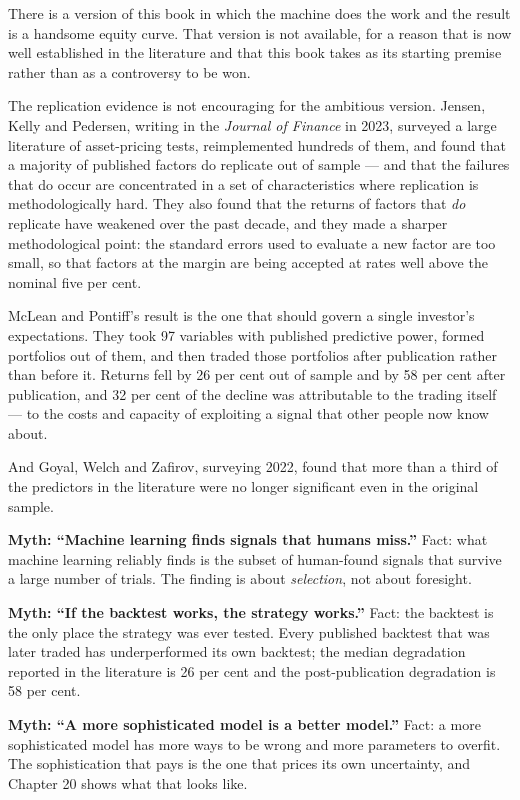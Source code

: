 There is a version of this book in which the machine does the work and the
result is a handsome equity curve. That version is not available, for a
reason that is now well established in the literature and that this book
takes as its starting premise rather than as a controversy to be won.

The replication evidence is not encouraging for the ambitious version.
Jensen, Kelly and Pedersen, writing in the \emph{Journal of Finance} in
2023, surveyed a large literature of asset-pricing tests, reimplemented
hundreds of them, and found that a majority of published factors do
replicate out of sample --- and that the failures that do occur are
concentrated in a set of characteristics where replication is
methodologically hard. They also found that the returns of factors that
\emph{do} replicate have weakened over the past decade, and they made a
sharper methodological point: the standard errors used to evaluate a new
factor are too small, so that factors at the margin are being accepted at
rates well above the nominal five per cent.

McLean and Pontiff's result is the one that should govern a single
investor's expectations. They took 97 variables with published predictive
power, formed portfolios out of them, and then traded those portfolios
after publication rather than before it. Returns fell by 26 per cent
out of sample and by 58 per cent after publication, and 32 per cent of the
decline was attributable to the trading itself --- to the costs and
capacity of exploiting a signal that other people now know about.

And Goyal, Welch and Zafirov, surveying 2022, found that more than a third
of the predictors in the literature were no longer significant even
in the original sample.

\begin{commonmyths}
\item \textbf{Myth: ``Machine learning finds signals that humans miss.''}
Fact: what machine learning reliably finds is the subset of human-found
signals that survive a large number of trials. The finding is about
\emph{selection}, not about foresight.
\item \textbf{Myth: ``If the backtest works, the strategy works.''}
Fact: the backtest is the only place the strategy was ever tested. Every
published backtest that was later traded has underperformed its own
backtest; the median degradation reported in the literature is 26 per cent
and the post-publication degradation is 58 per cent.
\item \textbf{Myth: ``A more sophisticated model is a better model.''}
Fact: a more sophisticated model has more ways to be wrong and more
parameters to overfit. The sophistication that pays is the one that
prices its own uncertainty, and Chapter 20 shows what that looks like.
\end{commonmyths}

